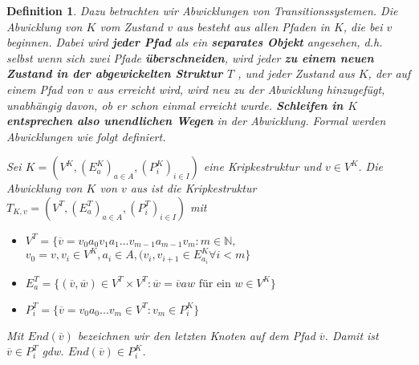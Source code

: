 \documentclass[12pt,a4paper]{article}
\newtheorem{defi}{Definition}[section]
\begin{document}
\begin{defi}
Dazu betrachten wir Abwicklungen von Transitionssystemen. Die
Abwicklung von $K$ vom Zustand $v$ aus besteht aus allen Pfaden in
$K$, die bei $v$ beginnen. Dabei wird \textbf{jeder Pfad} als ein \textbf{separates Objekt}
angesehen, d.h. selbst wenn sich zwei Pfade \textbf{überschneiden}, wird jeder
\textbf{zu einem neuen Zustand in der abgewickelten Struktur $T$} , und jeder
Zustand aus $K$, der auf einem Pfad von $v$ aus erreicht wird, wird neu
zu der Abwicklung hinzugefügt, unabhängig davon, ob er schon einmal
erreicht wurde. \textbf{Schleifen in $K$ entsprechen also unendlichen Wegen} in
der Abwicklung. Formal werden Abwicklungen wie folgt definiert.

Sei $K = (V^K, (E^K_a)_{a \in A}, (P^K_i)_{i\in I})$ eine Kripkestruktur
und $v \in V^K$. Die Abwicklung von $K$ von $v$ aus ist die Kripkestruktur
$T_{K,v} = (V^T, (E^T_a)_{a \in A}, (P^T_i)_{i\in I})$ mit
\begin{itemize}
	\item $V^T = \{ \overline{v} = v_0a_0v_1a_1...v_{m-1}a_{m-1}v_m : m \in \mathbb{N},$\\
	$v_0 = v, v_i \in V^K, a_i \in A, (v_i, v_{i+1} \in E^K_{a_i} \forall i < m \}$
	
	\item $E^T_a = \{ (\overline{v},\overline{w}) \in V^T \times V^T: \overline{w} = \overline{v}aw \text{ für ein } w \in V^K \}$
	
	\item $P^T_i = \{ \overline{v} = v_0a_0...v_m \in V^T: v_m \in P^K_i\} $
\end{itemize}
Mit $End(\overline{v})$ bezeichnen wir den letzten Knoten auf dem Pfad $\overline{v}$.
Damit ist $\overline{v} \in P^T_i$ gdw. $End(\overline{v}) \in P^K_i$.

\end{defi}
\end{document}
